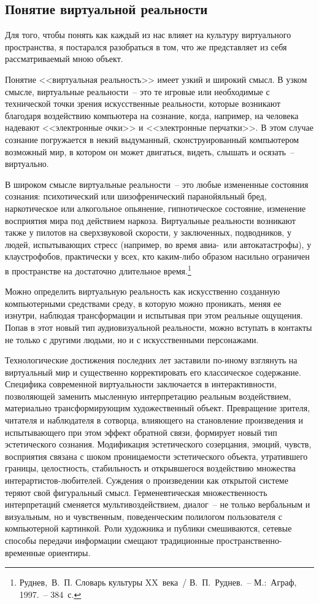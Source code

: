   \subsection{Понятие виртуальной реальности}

  Для того, чтобы понять как каждый из нас влияет на культуру виртуального
  пространства, я постарался разобраться в том, что же представляет из себя
  рассматриваемый мною объект.

  Понятие <<виртуальная реальность>> имеет узкий и широкий смысл. В узком
  смысле, виртуальные реальности~-- это те игровые или необходимые с технической точки
  зрения искусственные реальности, которые возникают благодаря воздействию
  компьютера на сознание, когда, например, на человека надевают <<электронные
  очки>> и <<электронные перчатки>>. В этом случае сознание погружается в
  некий выдуманный, сконструированный компьютером возможный мир, в котором он
  может двигаться, видеть, слышать и осязать~-- виртуально.

  В широком смысле виртуальные реальности~-- это любые измененные состояния
  сознания: психотический или шизофренический паранойяльный бред, наркотическое
  или алкогольное опьянение, гипнотическое состояние, изменение восприятия мира
  под действием наркоза. Виртуальные реальности возникают также у пилотов на
  сверхзвуковой скорости, у заключенных, подводников, у людей, испытывающих
  стресс (например, во время авиа-~или автокатастрофы), у клаустрофобов,
  практически у всех, кто каким-либо образом насильно ограничен в пространстве
  на достаточно длительное время.\footnote{Руднев,~В.~П. Словарь культуры
  XX~века~/ В.~П.~Руднев.~-- М.:~Аграф, 1997.~-- 384~с.}

	Можно определить виртуальную реальность как искусственно созданную
	компьютерными средствами среду, в которую можно проникать, меняя ее изнутри,
	наблюдая трансформации и испытывая при этом реальные ощущения. Попав в этот
	новый тип аудиовизуальной реальности, можно вступать в контакты не только с
	другими людьми, но и с искусственными персонажами.

  Технологические достижения последних лет заставили по-иному взглянуть на
  виртуальный мир и существенно корректировать его классическое содержание.
  Специфика современной виртуальности заключается в интерактивности, позволяющей
  заменить мысленную интерпретацию реальным воздействием, материально
  трансформирующим художественный объект. Превращение зрителя, читателя и
  наблюдателя в сотворца, влияющего на становление произведения и испытывающего
  при этом эффект обратной связи, формирует новый тип эстетического сознания.
  Модификация эстетического созерцания, эмоций, чувств, восприятия связана с
  шоком проницаемости эстетического объекта, утратившего границы, целостность,
  стабильность и открывшегося воздействию множества интерартистов-любителей.
  Суждения о произведении как открытой системе теряют свой фигуральный смысл.
  Герменевтическая множественность интерпретаций сменяется мультивоздействием,
  диалог~-- не только вербальным и визуальным, но и чувственным, поведенческим
  полилогом пользователя с компьютерной картинкой. Роли художника и публики
  смешиваются, сетевые способы передачи информации смещают традиционные
  пространственно-временные ориентиры.

